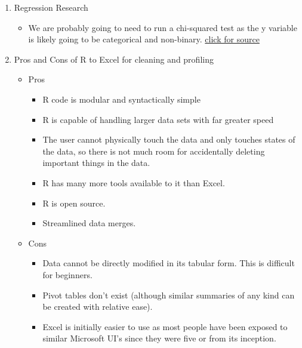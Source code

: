 \documentclass[]{article}
\providecommand{\tightlist}{%
  \setlength{\itemsep}{0pt}\setlength{\parskip}{0pt}}
\begin{document}
\begin{enumerate}
\def\labelenumi{\arabic{enumi}.}
\tightlist
\item
  Regression Research

  \begin{itemize}
  \tightlist
  \item
    We are probably going to need to run a chi-squared test as the y
    variable is likely going to be categorical and non-binary.
    \href{https://stats.idre.ucla.edu/other/mult-pkg/whatstat/}{click
    for source}
  \end{itemize}
\item
  Pros and Cons of R to Excel for cleaning and profiling

  \begin{itemize}
  \tightlist
  \item
    Pros

    \begin{itemize}
    \tightlist
    \item
      R code is modular and syntactically simple
    \item
      R is capable of handling larger data sets with far greater speed
    \item
      The user cannot physically touch the data and only touches states
      of the data, so there is not much room for accidentally deleting
      important things in the data.
    \item
      R has many more tools available to it than Excel.
    \item
      R is open source.
    \item
      Streamlined data merges.
    \end{itemize}
  \item
    Cons

    \begin{itemize}
    \tightlist
    \item
      Data cannot be directly modified in its tabular form. This is
      difficult for beginners.
    \item
      Pivot tables don't exist (although similar summaries of any kind
      can be created with relative ease).
    \item
      Excel is initially easier to use as most people have been exposed
      to similar Microsoft UI's since they were five or from its
      inception.
    \end{itemize}
  \end{itemize}
\end{enumerate}
\end{document}

